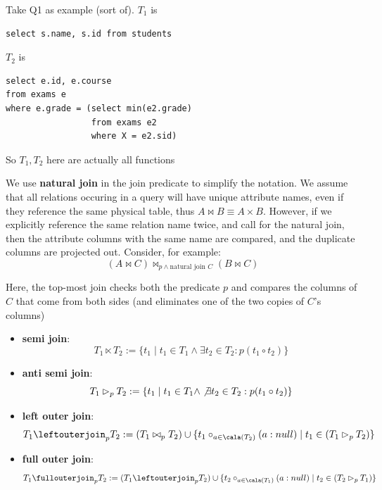 \documentclass[11pt]{article}
\begin{document}
Take Q1 as example (sort of). \(T_1\) is
\begin{verbatim}
select s.name, s.id from students
\end{verbatim}
\(T_2\) is
\begin{verbatim}
select e.id, e.course
from exams e
where e.grade = (select min(e2.grade)
                 from exams e2
                 where X = e2.sid)
\end{verbatim}
So \(T_1, T_2\) here are actually all functions

We use \textbf{natural join} in the join predicate to simplify the notation. We assume that all relations
occuring in a query will have unique attribute names, even if they reference the same physical table,
thus \(A\bowtie B\equiv A\times B\). However, if we explicitly reference the same relation name twice,
and call for the natural join, then the attribute columns with the same name are compared, and the
duplicate columns are projected out. Consider, for example:
\begin{equation*}
(A\bowtie C)\bowtie_{p\wedge\text{natural join }C}(B\bowtie C)
\end{equation*}

Here, the top-most join checks both the predicate \(p\) and compares the columns of \(C\) that come
from both sides (and eliminates one of the two copies of \(C\)'s columns)

\begin{itemize}
\item \textbf{semi join}:
\begin{equation*}
T_1\ltimes T_2:=\{t_1\mid t_1\in T_1\wedge \exists t_2\in T_2:p(t_1\circ t_2)\}
\end{equation*}
\item \textbf{anti semi join}:
\begin{equation*}
T_1\rhd_pT_2:=\{t_1\mid t_1\in T_1\wedge\not\exists t_2\in T_2:p(t_1\circ t_2)\}
\end{equation*}
\item \textbf{left outer join}:
\begin{equation*}
T_1\leftouterjoin_pT_2:=(T_1\bowtie_pT_2)\cup\{t_1\circ_{a\in\cala(T_2)}(a:null)\mid
t_1\in(T_1\rhd_pT_2)\}
\end{equation*}
\item \textbf{full outer join}:
\begin{equation*}
T_1\fullouterjoin_p T_2:=(T_1\leftouterjoin_p T_2)\cup\{t_2\circ_{a\in\cala(T_1)}(a:null)\mid t_2\in(T_2\rhd_pT_1)\}
\end{equation*}
\end{itemize}
\end{document}
